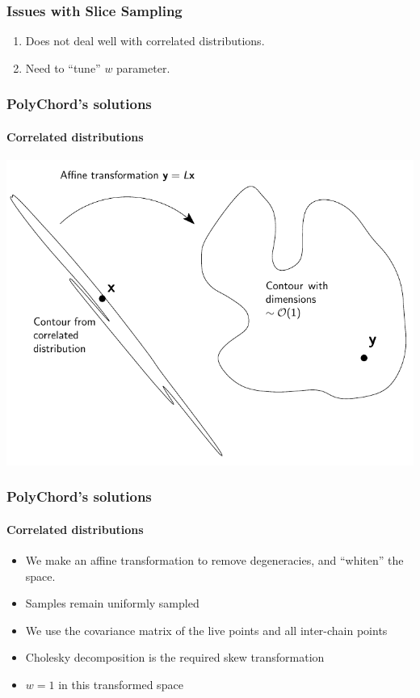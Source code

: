 \documentclass[]{beamer}
\begin{document}
\begin{frame}
  \frametitle{Issues with Slice Sampling}

  \begin{enumerate}
    \item<2-> Does not deal well with correlated distributions.
    \item<3-> Need to ``tune'' $w$ parameter.
  \end{enumerate}
\end{frame}

\begin{frame}
  \frametitle{PolyChord's solutions}
  \framesubtitle{Correlated distributions}

  \includegraphics[width=\textwidth]{figures/contour_transform}

\end{frame}


\begin{frame}
  \frametitle{PolyChord's solutions}
  \framesubtitle{Correlated distributions}

  \begin{itemize}
    \item<2-> We make an affine transformation to remove degeneracies, and ``whiten'' the space.
    \item<3-> Samples remain uniformly sampled
    \item<4-> We use the covariance matrix of the live points and all inter-chain points 
    \item<5-> Cholesky decomposition is the required skew transformation
    \item<6-> $w=1$ in this transformed space
  \end{itemize}
\end{frame}
\end{document}
